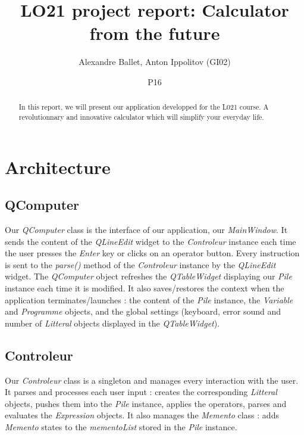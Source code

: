 \documentclass[titlepage]{article}
\begin{document}
\title{LO21 project report: Calculator from the future}
\author{Alexandre Ballet, Anton Ippolitov (GI02)}
\date{P16}
\maketitle

\tableofcontents

\begin{abstract}
In this report, we will present our application developped for the L021 course. A revolutionnary and innovative calculator which will simplify your everyday life.
\end{abstract}

\section{Architecture}

    \subsection{QComputer}

    Our \textit{QComputer} class is the interface of our application, our \textit{MainWindow}. It sends the content of the \textit{QLineEdit} widget to the \textit{Controleur} instance each time the user presses the \textit{Enter} key or clicks on an operator button. Every instruction is sent to the \textit{parse()} method of the \textit{Controleur} instance by the \textit{QLineEdit} widget. The \textit{QComputer} object refreshes the \textit{QTableWidget} displaying our \textit{Pile} instance each time it is modified.
    It also saves/restores the context when the application terminates/launches : the content of the \textit{Pile} instance, the \textit{Variable} and \textit{Programme} objects, and the global settings (keyboard, error sound and number of \textit{Litteral} objects displayed in the \textit{QTableWidget}).\\

    \subsection{Controleur}

    Our \textit{Controleur} class is a singleton and manages every interaction with the user. It parses and processes each user input : creates the corresponding \textit{Litteral} objects, pushes them into the \textit{Pile} instance, applies the operators, parses and evaluates the \textit{Expression} objects. It also manages the \textit{Memento} class : adds \textit{Memento} states to the \textit{mementoList} stored in the \textit{Pile} instance.\\
\end{document}
